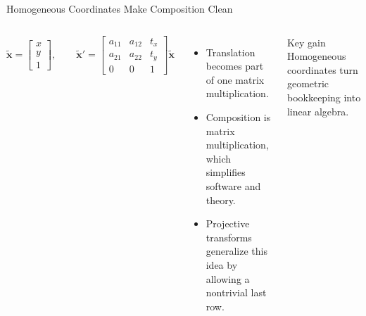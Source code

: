 \documentclass[aspectratio=169,10pt]{beamer}
\begin{document}
\begin{frame}{Homogeneous Coordinates Make Composition Clean}
\begin{columns}[T,onlytextwidth]
\[
\tilde{\mathbf{x}} = \begin{bmatrix}x \\ y \\ 1\end{bmatrix}, \qquad
\tilde{\mathbf{x}}' =
\begin{bmatrix}
a_{11} & a_{12} & t_x \\
a_{21} & a_{22} & t_y \\
0 & 0 & 1
\end{bmatrix}
\tilde{\mathbf{x}}
\]
\vspace{-0.5em}
\begin{itemize}
\item Translation becomes part of one matrix multiplication.
\item Composition is matrix multiplication, which simplifies software and theory.
\item Projective transforms generalize this idea by allowing a nontrivial last row.
\end{itemize}

\begin{block}{Key gain}
Homogeneous coordinates turn geometric bookkeeping into linear algebra.
\end{block}
\end{columns}
\end{frame}
\end{document}
